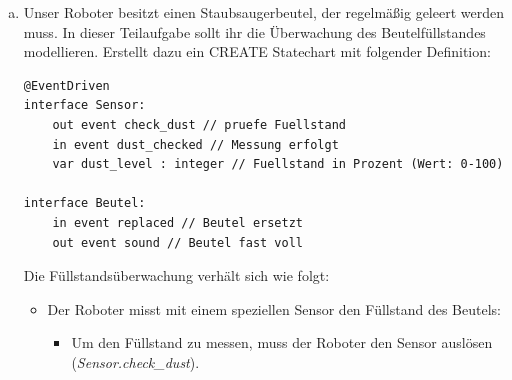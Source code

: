 \begin{enumerate}[a)]
\begin{itemize}
\item Ist der Roboter eingeschaltet, wird er durch erneuten Druck auf den power-Knopf (\textit{Remote.power})
ausgeschaltet (\textit{Status.aus}). Bei erneutem Einschalten startet er in dem Modus, in dem er sich beim
Ausschalten befunden hat. Dabei muss der Modus nicht auf der Statusanzeige ausgegeben werden.

\item Ist der Roboter eingeschaltet, überwacht er seine Umgebung auf Hindernisse:
  \begin{itemize}
  \item Erkennt der Umgebungssensor ein Hindernis (\textit{Hindernis.detect}), zeigt der Roboter eine entsprechende
  Meldung an (\textit{Status.hindernis}).
  \item Ist der Roboter ausgeschaltet, soll er Events des Umgebungssensors ignorieren.
  \end{itemize}
\end{itemize}

\textbf{Modelliert das beschriebene Verhalten in eurem Statechart.} Nutzt Hierarchie und Nebenläufigkeit, wo möglich.
Verwendet \textbf{ausschließlich} die in der Spezifikation genannten Events aus der Definition. Ihr dürft die Definition
\textbf{nicht verändern}, d.h.\ auch keine weiteren Events oder Variablen hinzufügen.
\item Unser Roboter besitzt einen Staubsaugerbeutel, der regelmäßig geleert werden muss.
In dieser Teilaufgabe sollt ihr die Überwachung des Beutelfüllstandes modellieren.
Erstellt dazu ein CREATE Statechart mit folgender Definition:

\begin{lstlisting}
@EventDriven
interface Sensor:
    out event check_dust // pruefe Fuellstand
    in event dust_checked // Messung erfolgt
    var dust_level : integer // Fuellstand in Prozent (Wert: 0-100)

interface Beutel:
    in event replaced // Beutel ersetzt
    out event sound // Beutel fast voll
\end{lstlisting}

Die Füllstandsüberwachung verhält sich wie folgt:
\begin{itemize}
\item Der Roboter misst mit einem speziellen Sensor den Füllstand des Beutels:
  \begin{itemize}
  \item Um den Füllstand zu messen, muss der Roboter den Sensor auslösen
  (\textit{Sensor.check\_dust}).


\end{itemize}
\end{itemize}
\end{enumerate}
